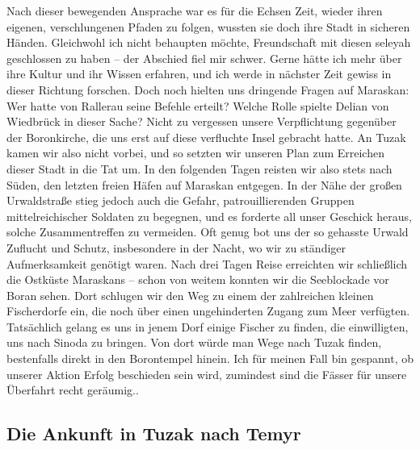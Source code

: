 Nach dieser bewegenden Ansprache war es für die Echsen Zeit, wieder ihren eigenen, verschlungenen Pfaden zu folgen, wussten sie doch ihre Stadt in sicheren Händen. Gleichwohl ich nicht behaupten möchte, Freundschaft mit diesen seleyah geschlossen zu haben -- der Abschied fiel mir schwer. Gerne hätte ich mehr über ihre Kultur und ihr Wissen erfahren, und ich werde in nächster Zeit gewiss in dieser Richtung forschen. Doch noch hielten uns dringende Fragen auf Maraskan: Wer hatte von Rallerau seine Befehle erteilt? Welche Rolle spielte Delian von Wiedbrück in dieser Sache? Nicht zu vergessen unsere Verpflichtung gegenüber der Boronkirche, die uns erst auf diese verfluchte Insel gebracht hatte. An Tuzak kamen wir also nicht vorbei, und so setzten wir unseren Plan zum Erreichen dieser Stadt in die Tat um. In den folgenden Tagen reisten wir also stets nach Süden, den letzten freien Häfen auf Maraskan entgegen. In der Nähe der großen Urwaldstraße stieg jedoch auch die Gefahr, patrouillierenden Gruppen mittelreichischer Soldaten zu begegnen, und es forderte all unser Geschick heraus, solche Zusammentreffen zu vermeiden. Oft genug bot uns der so gehasste Urwald Zuflucht und Schutz, insbesondere in der Nacht, wo wir zu ständiger Aufmerksamkeit genötigt waren. Nach drei Tagen Reise erreichten wir schließlich die Ostküste Maraskans -- schon von weitem konnten wir die Seeblockade vor Boran sehen. Dort schlugen wir den Weg zu einem der zahlreichen kleinen Fischerdorfe ein, die noch über einen ungehinderten Zugang zum Meer verfügten. Tatsächlich gelang es uns in jenem Dorf einige Fischer zu finden, die einwilligten, uns nach Sinoda zu bringen. Von dort würde man Wege nach Tuzak finden, bestenfalls direkt in den Borontempel hinein. Ich für meinen Fall bin gespannt, ob unserer Aktion Erfolg beschieden sein wird, zumindest sind die Fässer für unsere Überfahrt recht geräumig..

\subsection{Die Ankunft in Tuzak nach Temyr}

